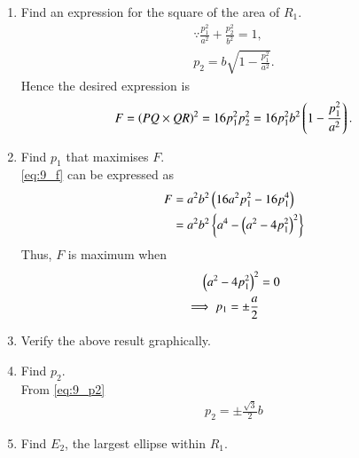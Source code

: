 \documentclass[journal,12pt,twocolumn]{IEEEtran}
\renewcommand\thesection{\arabic{section}}
\begin{document}
\begin{enumerate}[label=\thesection.\arabic*
,ref=\thesection.\theenumi]
\begin{align}
\vec{Q} &= \vec{P}   -2\vec{m}_1^T\vec{P} \vec{m}_1
\nonumber \\
&= \myvec{-p_1 \\ p_2}
\end{align}
%
Similarly, 
\begin{align}
\vec{S} &= \vec{P}   -2\vec{m}_2^T\vec{P} \vec{m}_2
\nonumber \\
&= \myvec{p_1 \\ -p_2}
\end{align}
%
and 
\begin{align}
\vec{R} &= \vec{Q}   -2\vec{m}_2^T\vec{Q} \vec{m}_2
\nonumber \\
&= \myvec{-p_1 \\ -p_2}
\end{align}
\item Find an expression for the square of the area of $R_1$.
\\
\solution 
\begin{align}
\because \frac{p_1^2}{a^2}+\frac{p_2^2}{b^2} = 1,
\nonumber \\
p_2 = b \sqrt{1 - \frac{p_1^2}{a^2}}.
\label{eq:9_p2}
\end{align}
%
Hence the desired expression is 
\begin{align}
\label{eq:9_f}
F = \left(PQ\times QR\right)^2 = 16 p_1^2 p_2^2 = 16 p_1^2b^2 \left(1 - \frac{p_1^2}{a^2}\right).
\end{align}
%
\item Find $p_1$ that maximises $F$.
\\
\solution \eqref{eq:9_f} can be expressed as
\begin{align}
F &=  a^2b^2 \left(16 a^2p_1^2 - 16p_1^4\right)
\nonumber \\
 &=  a^2b^2 \left\{a^4-\left(a^2-4p_1^2\right)^2 \right\}
\end{align}
%
Thus, $F$ is maximum when 
\begin{align}
\left(a^2-4p_1^2\right)^2 &= 0
\nonumber \\
\implies p_1 = \pm \frac{a}{2}
\label{eq:9_p1sol}
\end{align}
\item Verify the above result graphically.
\item Find $p_2$.
\\
\solution From \eqref{eq:9_p2}
\begin{align}
 p_2 = \pm\frac{ \sqrt{3}}{2}b
\label{eq:9_p2sol}
\end{align}
%
\item Find $E_2$, the largest ellipse within $R_1$.
\\

\end{enumerate}
\end{document}
